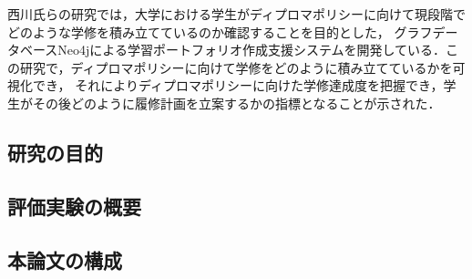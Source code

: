 西川氏らの研究では，大学における学生がディプロマポリシーに向けて現段階でどのような学修を積み立てているのか確認することを目的とした，
グラフデータベースNeo4jによる学習ポートフォリオ作成支援システムを開発している\cite{nisi}．この研究で，ディプロマポリシーに向けて学修をどのように積み立てているかを可視化でき，
それによりディプロマポリシーに向けた学修達成度を把握でき，学生がその後どのように履修計画を立案するかの指標となることが示された．
\subsection{研究の目的}

\subsection{評価実験の概要}

\subsection{本論文の構成}
